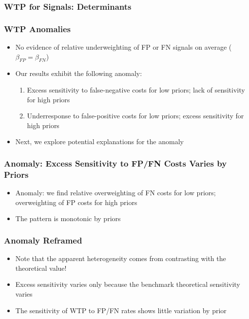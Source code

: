 \documentclass[11pt,hyperref={bookmarks=false}]{beamer}
\begin{document}
\begin{frame}
\frametitle{WTP for Signals: Determinants}
\scriptsize

\end{frame}



\begin{frame}
\frametitle{WTP Anomalies}
\begin{itemize}
\item No evidence of relative underweighting of FP or FN signals on average ($\beta_{FP}=\beta_{FN}$)
\item Our results exhibit the following anomaly:
\begin{enumerate}
\item Excess sensitivity to false-negative costs for low priors; lack of sensitivity for high priors
\item Underresponse to false-positive costs for low priors; excess sensitivity for high priors
\end{enumerate}
\item Next, we explore potential explanations for the anomaly
\end{itemize}
\end{frame}



\begin{frame}
\frametitle{Anomaly: Excess Sensitivity to FP/FN Costs Varies by Priors}
\begin{itemize}
\item Anomaly: we find relative overweighting of FN costs for low priors; overweighting of FP costs for high priors
\item The pattern is monotonic by priors
\end{itemize}
\footnotesize

\end{frame}



\begin{frame}
\frametitle{Anomaly Reframed}
\begin{itemize}
\item Note that the apparent heterogeneity comes from contrasting with the theoretical value!
\item Excess sensitivity varies only because the benchmark theoretical sensitivity varies
\item The sensitivity of WTP to FP/FN rates shows little variation by prior
\end{itemize}
\scriptsize
\begin{center}

\end{center}
\end{frame}
\end{document}

